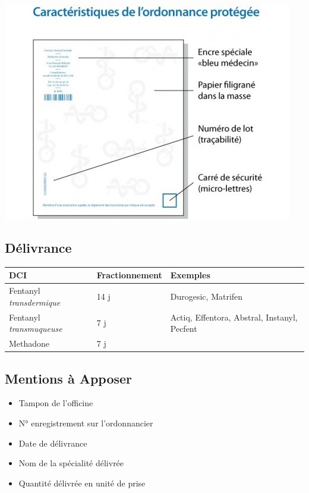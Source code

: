 \documentclass[11pt]{article}
\begin{document}
\begin{center}
\includegraphics[width=.9\linewidth]{./ordo_securisee.png}
\end{center}

\subsection{Délivrance}
\label{sec:orge4a0bf0}
\begin{center}
\begin{tabular}{lll}
DCI & Fractionnement & Exemples\\
\hline
Fentanyl \emph{transdermique} & 14 j & Durogesic, Matrifen\\
Fentanyl \emph{transmuqueuse} & 7 j & Actiq, Effentora, Abstral, Instanyl, Pecfent\\
Methadone & 7 j & \\
\end{tabular}
\end{center}

\subsection{Mentions à Apposer}
\label{sec:orgdc2e6a3}
\begin{itemize}
\item Tampon de l'officine
\item N° enregistrement sur l'ordonnancier
\item Date de délivrance
\item Nom de la spécialité délivrée
\item Quantité délivrée en unité de prise
\end{itemize}
\end{document}
